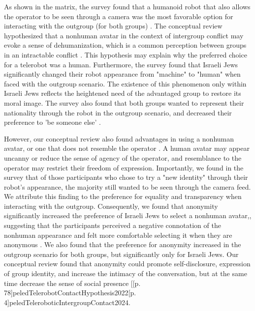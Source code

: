 \documentclass[dissertation,math,vertlayout,pdfa,colorlinks,nologo]{aaltoseries}
\makeatletter
\newcommand{\citecomment}[2][]{\citen{#2}#1\citevar}
\newcommand{\citeone}[1]{\citecomment{#1}}
\newcommand{\citetwo}[2][]{\citecomment[,~#1]{#2}}
\newcommand{\citevar}{\@ifnextchar\bgroup{;~\citeone}{\@ifnextchar[{;~\citetwo}{]}}}
\newcommand{\citefirst}{\@ifnextchar\bgroup{\citeone}{\@ifnextchar[{\citetwo}{]}}}
\newcommand{\cites}{[\citefirst}
\makeatother
\begin{document}
As shown in the matrix, the survey found that a humanoid robot that also allows the operator to be seen through a camera was the most favorable option for interacting with the outgroup (for both groups) \cite[p. 11]{peledTeleroboticIntergroupContact2024}. The conceptual review hypothesized that a nonhuman avatar in the context of intergroup conflict may evoke a sense of dehumanization, which is a common perception between groups in an intractable conflict \cite[p. 79]{peledTelerobotContactHypothesis2022}. This hypothesis may explain why the preferred choice for a telerobot was a human. Furthermore, the survey found that Israeli Jews significantly changed their robot appearance from "machine" to "human" when faced with the outgroup scenario. The existence of this phenomenon only within Israeli Jews reflects the heightened need of the advantaged group to restore its moral image. The survey also found that both groups wanted to represent their nationality through the robot in the outgroup scenario, and decreased their preference to 'be someone else' \cite[p. 11]{peledTeleroboticIntergroupContact2024}.

However, our conceptual review also found advantages in using a nonhuman avatar, or one that does not resemble the operator \cite[p. 81]{peledTelerobotContactHypothesis2022}. A human avatar may appear uncanny or reduce the sense of agency of the operator, and resemblance to the operator may restrict their freedom of expression. Importantly, we found in the survey that of those participants who chose to try a "new identity" through their robot's appearance, the majority still wanted to be seen through the camera feed. We attribute this finding to the preference for equality and transparency when interacting with the outgroup. Consequently, we found that anonymity significantly increased the preference of Israeli Jews to select a nonhuman avatar,\cite[p. 11]{peledTeleroboticIntergroupContact2024}, suggesting that the participants perceived a negative connotation of the nonhuman appearance and felt more comfortable selecting it when they are anonymous \cite[p. 4]{peledTeleroboticIntergroupContact2024}. We also found that the preference for anonymity increased in the outgroup scenario for both groups, but significantly only for Israeli Jews. Our conceptual review found that anonymity could promote self-disclosure, expression of group identity, and increase the intimacy of the conversation, but at the same time decrease the sense of social presence \cites[p. 78]{peledTelerobotContactHypothesis2022}[p. 4]{peledTeleroboticIntergroupContact2024}.
\end{document}
